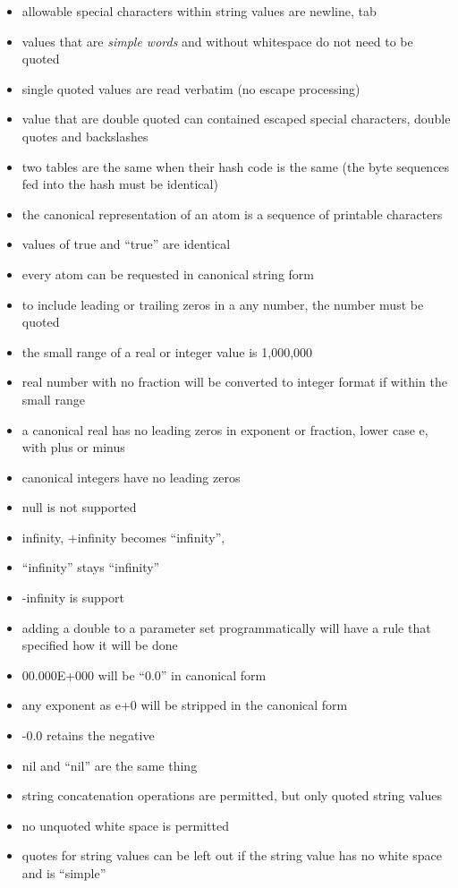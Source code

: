 \documentclass{memarticle}
\begin{document}
\begin{itemize}
\item allowable special characters within string values are newline, tab
\item values that are \emph{simple words} and without whitespace do not need to be quoted
\item single quoted values are read verbatim (no escape processing)
\item value that are double quoted can contained escaped special characters, double quotes and backslashes
\item two tables are the same when their hash code is the same (the byte sequences fed into the hash must be identical)
\item the canonical representation of an atom is a sequence of printable characters
\item values of true and ``true'' are identical
\item every atom can be requested in canonical string form
\item to include leading or trailing zeros in a any number, the number must be quoted
\item the small range of a real or integer value is 1,000,000
\item real number with no fraction will be converted to integer format if within the small range
\item a canonical real has no leading zeros in exponent or fraction, lower case e, with plus or minus
\item canonical integers have no leading zeros
\item null is not supported
\item infinity, +infinity becomes ``infinity'', 
\item ``infinity'' stays ``infinity''
\item -infinity is support
\item adding a double to a parameter set programmatically will have a rule that specified how it will be done
\item 00.000E+000 will be ``0.0'' in canonical form
\item any exponent as e+0 will be stripped in the canonical form
\item -0.0 retains the negative
\item nil and ``nil'' are the same thing
\item string concatenation operations are permitted, but only quoted string values
\item no unquoted white space is permitted
\item quotes for string values can be left out if the string value has no white space and is ``simple''
\end{itemize}
\end{document}
